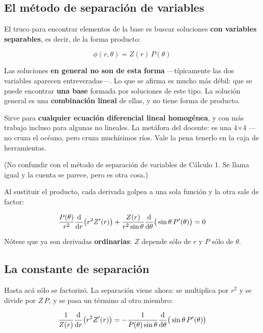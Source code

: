 \documentclass[12pt,a4paper]{article}
\begin{document}
\subsection{El método de separación de variables}

El truco para encontrar elementos de la base es buscar soluciones \textbf{con
variables separables}, es decir, de la forma producto:

\[
\phi(r,\theta) = Z(r)\,P(\theta)
\]

\begin{warnbox}
Las soluciones \textbf{en general no son de esta forma} ---típicamente las dos
variables aparecen entreveradas---. Lo que se afirma es mucho más débil: que se
puede encontrar \textbf{una base} formada por soluciones de este tipo. La solución
general es una \textbf{combinación lineal} de ellas, y no tiene forma de producto.
\end{warnbox}

\begin{notebox}
Sirve para \textbf{cualquier ecuación diferencial lineal homogénea}, y con más
trabajo incluso para algunas no lineales. La metáfora del docente: es una 4$\times$4
--- no cruza el océano, pero cruza muchísimos ríos. Vale la pena tenerlo en la caja
de herramientas.

(No confundir con el método de separación de variables de Cálculo 1. Se llama
igual y la cuenta se parece, pero es otra cosa.)
\end{notebox}

Al sustituir el producto, cada derivada golpea a una sola función y la otra sale
de factor:

\[
\frac{P(\theta)}{r^2}\dv{r}\big(r^2 Z'(r)\big)
+ \frac{Z(r)}{r^2\sin\theta}\dv{\theta}\big(\sin\theta\,P'(\theta)\big) = 0
\]

Nótese que ya son derivadas \textbf{ordinarias}: $Z$ depende sólo de $r$ y $P$
sólo de $\theta$.

\subsection{La constante de separación}

Hasta acá sólo se factorizó. La separación viene ahora: se multiplica por $r^2$ y
se divide por $Z\,P$, y se pasa un término al otro miembro:

\[
\frac{1}{Z(r)}\dv{r}\big(r^2 Z'(r)\big)
= -\frac{1}{P(\theta)\sin\theta}\dv{\theta}\big(\sin\theta\,P'(\theta)\big)
\]
\end{document}
